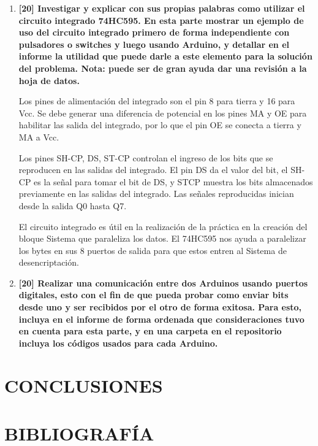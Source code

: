 \documentclass{ieeeojies}
\begin{document}
\begin{enumerate}
\item \textbf{[20] Investigar y explicar con sus propias palabras como utilizar el circuito integrado 74HC595. En esta parte mostrar un ejemplo de uso del circuito integrado primero de forma independiente con pulsadores o switches y luego usando Arduino, y detallar en el informe la utilidad que puede darle a este elemento para la solución del problema. Nota: puede ser de gran ayuda dar una revisión a la hoja de datos.} 


Los pines de alimentación del integrado son el pin 8 para tierra y 16 para Vcc.
Se debe generar una diferencia de potencial en los pines MA y OE para habilitar las salida del integrado, por lo que el pin OE se conecta a tierra y MA a Vcc.

Los pines SH-CP, DS, ST-CP controlan el ingreso de los bits que se reproducen en las salidas del integrado. El pin DS da el valor del bit, el SH-CP es la señal para tomar el bit de DS, y STCP muestra los bits almacenados previamente en las salidas del integrado. Las señales reproducidas inician desde la salida Q0 hasta Q7.

El circuito integrado es útil en la realización de la práctica en la creación del bloque Sistema que paraleliza los datos. El 74HC595 nos ayuda a paralelizar los bytes en sus 8 puertos de salida para que estos entren al Sistema de desencriptación.




\item \textbf{[20] Realizar una comunicación entre dos Arduinos usando puertos digitales, esto con el fin de que pueda probar como enviar bits desde uno y ser recibidos por el otro de forma
exitosa. Para esto, incluya en el informe de forma ordenada que consideraciones tuvo en
cuenta para esta parte, y en una carpeta en el repositorio incluya los códigos usados para
cada Arduino.}




\end{enumerate}

\section{CONCLUSIONES}

\appendices

\section*{BIBLIOGRAFÍA}






\EOD
\end{document}
